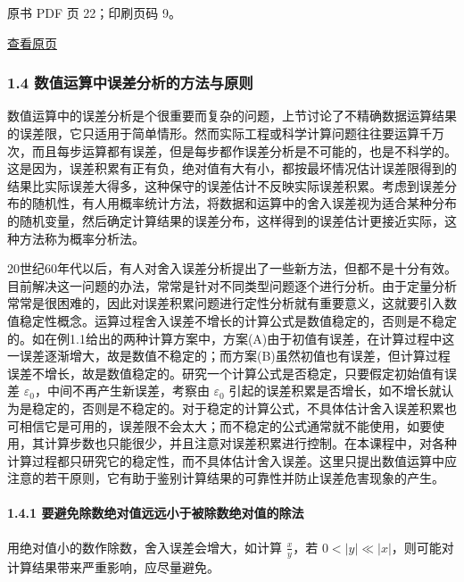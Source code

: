 \clearpage

原书 PDF 页 22；印刷页码 9。

\href{source-images/pdf-022.jpeg}{查看原页}

\subsubsection{1.4 数值运算中误差分析的方法与原则}\label{ch01-ux6570ux503cux8fd0ux7b97ux4e2dux8befux5deeux5206ux6790ux7684ux65b9ux6cd5ux4e0eux539fux5219}

数值运算中的误差分析是个很重要而复杂的问题，上节讨论了不精确数据运算结果的误差限，它只适用于简单情形。然而实际工程或科学计算问题往往要运算千万次，而且每步运算都有误差，但是每步都作误差分析是不可能的，也是不科学的。这是因为，误差积累有正有负，绝对值有大有小，都按最坏情况估计误差限得到的结果比实际误差大得多，这种保守的误差估计不反映实际误差积累。考虑到误差分布的随机性，有人用概率统计方法，将数据和运算中的舍入误差视为适合某种分布的随机变量，然后确定计算结果的误差分布，这样得到的误差估计更接近实际，这种方法称为概率分析法。

20世纪60年代以后，有人对舍入误差分析提出了一些新方法，但都不是十分有效。目前解决这一问题的办法，常常是针对不同类型问题逐个进行分析。由于定量分析常常是很困难的，因此对误差积累问题进行定性分析就有重要意义，这就要引入数值稳定性概念。运算过程舍入误差不增长的计算公式是数值稳定的，否则是不稳定的。如在例1.1给出的两种计算方案中，方案(A)由于初值有误差，在计算过程中这一误差逐渐增大，故是数值不稳定的；而方案(B)虽然初值也有误差，但计算过程误差不增长，故是数值稳定的。研究一个计算公式是否稳定，只要假定初始值有误差 \(\varepsilon_0\)，中间不再产生新误差，考察由 \(\varepsilon_0\) 引起的误差积累是否增长，如不增长就认为是稳定的，否则是不稳定的。对于稳定的计算公式，不具体估计舍入误差积累也可相信它是可用的，误差限不会太大；而不稳定的公式通常就不能使用，如要使用，其计算步数也只能很少，并且注意对误差积累进行控制。在本课程中，对各种计算过程都只研究它的稳定性，而不具体估计舍入误差。这里只提出数值运算中应注意的若干原则，它有助于鉴别计算结果的可靠性并防止误差危害现象的产生。

\paragraph{1.4.1 要避免除数绝对值远远小于被除数绝对值的除法}\label{ch01-ux8981ux907fux514dux9664ux6570ux7eddux5bf9ux503cux8fdcux8fdcux5c0fux4e8eux88abux9664ux6570ux7eddux5bf9ux503cux7684ux9664ux6cd5}

用绝对值小的数作除数，舍入误差会增大，如计算 \(\frac{x}{y}\)，若 \(0 < |y| \ll |x|\)，则可能对计算结果带来严重影响，应尽量避免。

